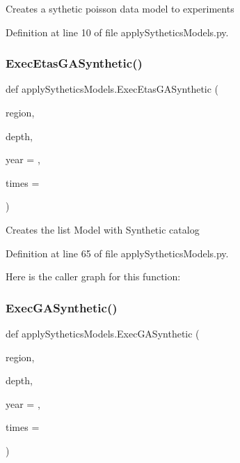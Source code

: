 \begin{DoxyVerb}Creates a sythetic poisson data model to experiments
\end{DoxyVerb}
 

Definition at line 10 of file apply\+Sythetics\+Models.\+py.

\mbox{\label{namespaceapply_sythetics_models_a6a5fa223090e2fa7094ec119c576f6eb}} 
\subsubsection{\texorpdfstring{Exec\+Etas\+G\+A\+Synthetic()}{ExecEtasGASynthetic()}}
{\footnotesize\ttfamily def apply\+Sythetics\+Models.\+Exec\+Etas\+G\+A\+Synthetic (\begin{DoxyParamCaption}\item[{}]{region,  }\item[{}]{depth,  }\item[{}]{year = {},  }\item[{}]{times = {} }\end{DoxyParamCaption})}

\begin{DoxyVerb}Creates the list Model with Synthetic catalog
\end{DoxyVerb}
 

Definition at line 65 of file apply\+Sythetics\+Models.\+py.

Here is the caller graph for this function\+:
\mbox{\label{namespaceapply_sythetics_models_a2d73b275f7513fce9beb30dc8ff7d806}} 
\subsubsection{\texorpdfstring{Exec\+G\+A\+Synthetic()}{ExecGASynthetic()}}
{\footnotesize\ttfamily def apply\+Sythetics\+Models.\+Exec\+G\+A\+Synthetic (\begin{DoxyParamCaption}\item[{}]{region,  }\item[{}]{depth,  }\item[{}]{year = {},  }\item[{}]{times = {} }\end{DoxyParamCaption})}

